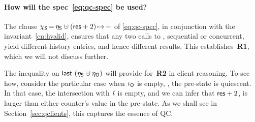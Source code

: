 
%


\paragraph{How will the spec~\eqref{eq:qc-spec} be used?}

The clause $\hists\,{=}\,\gists \hunion (\res+2)\,{\mapsto}\,-$ of
\eqref{eq:qc-spec}, in conjunction with the invariant~\ref{cn:hvalid},
ensures that any two calls to , sequential or
concurrent, yield different history entries, and hence different
results. This establishes~\textbf{R1}, which we will not discuss
further.

The inequality on $\last~(\gists \hunion \gisto)$ will provide
for~\textbf{R2} in client reasoning. To see how, consider the
particular case when $\iota_{\mathsf{O}}$ is empty, \ie, the pre-state is
quiescent. In that case, the intersection with $\hat{\iota}$ is empty, and
we can infer that $\mathsf{res} + 2$, is larger than either counter's value in
the pre-state. As we shall see in Section~\ref{sec:qclients}, this
captures the essence of QC.

